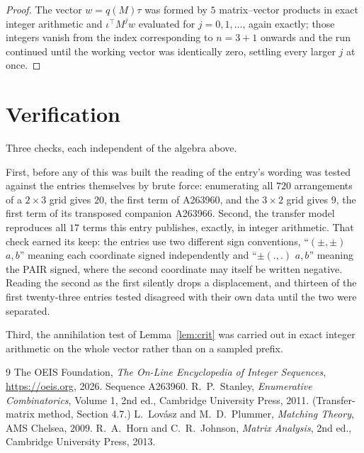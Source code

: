 \documentclass[11pt,a4paper]{article}
\theoremstyle{plain}
\theoremstyle{definition}
\begin{document}
\begin{proof}
The vector $w=q(M)\tau$ was formed by $5$ matrix--vector products in exact integer
arithmetic and $\iota^{\!\top}M^{j}w$ evaluated for $j=0,1,\dots$, again exactly; those
integers vanish from the index corresponding to $n=3+1$ onwards and the run continued
until the working vector was identically zero, settling every larger $j$ at once.
\end{proof}

\section{Verification}

Three checks, each independent of the algebra above.

First, before any of this was built the reading of the entry's wording was tested against the
entries themselves by brute force: enumerating all $720$ arrangements of a $2\times3$ grid
gives $20$, the first term of A263960, and the $3\times2$ grid gives $9$, the first term of its
transposed companion A263966. Second, the transfer model reproduces all $17$ terms this
entry publishes, exactly, in integer arithmetic. That check earned its keep: the entries use
two different sign conventions, ``$(\pm,\pm)$ $a,b$'' meaning each coordinate signed
independently and ``$\pm(.,.)$ $a,b$'' meaning the PAIR signed, where the second coordinate may
itself be written negative. Reading the second as the first silently drops a displacement, and
thirteen of the first twenty-three entries tested disagreed with their own data until the two
were separated.

Third, the annihilation test of Lemma~\ref{lem:crit} was carried out in exact integer
arithmetic on the whole vector rather than on a sampled prefix.

\begin{thebibliography}{9}
 The OEIS Foundation, \emph{The On-Line Encyclopedia of Integer
Sequences}, \url{https://oeis.org}, 2026. Sequence A263960.
 R.~P.~Stanley, \emph{Enumerative Combinatorics}, Volume 1, 2nd ed.,
Cambridge University Press, 2011. (Transfer-matrix method, Section 4.7.)
 L.~Lov\'asz and M.~D.~Plummer, \emph{Matching Theory}, AMS Chelsea, 2009.
 R.~A.~Horn and C.~R.~Johnson, \emph{Matrix Analysis}, 2nd ed., Cambridge
University Press, 2013.
\end{thebibliography}
\end{document}
